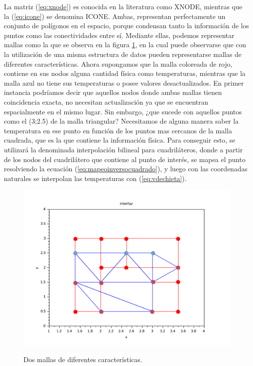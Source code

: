 La matriz (\ref{eq:xnode}) es conocida en la literatura como XNODE, mientras que la (\ref{eq:icone}) se denomina ICONE. Ambas, representan perfectamente un conjunto de polígonos en el espacio, porque condensan tanto la información de los puntos como las conectividades entre sí. Mediante ellas, podemos representar mallas como la que se observa en la figura \ref{fig:malla1}, en la cual puede observarse que con la utilización de una misma estructura de datos pueden representarse mallas de diferentes características. Ahora supongamos que la malla coloreada de rojo, contiene en sus nodos alguna cantidad física como temperaturas, mientras que la malla azul no tiene sus temperaturas o posee valores desactualizados. En primer instancia podríamos decir que aquellos nodos donde ambas mallas tienen coincidencia exacta, no necesitan actualización ya que se encuentran espacialmente en el mismo lugar. Sin embargo, ¿que sucede con aquellos puntos como el (3;2.5) de la malla triangular? Necesitamos de alguna manera saber la temperatura en ese punto en función de los puntos mas cercanos de la malla cuadrada, que es la que contiene la información física. Para conseguir esto, se utilizará la denominada interpolación bilineal para cuadriláteros, donde a partir de los nodos del cuadrilátero que contiene al punto de interés, se mapea el punto resolviendo la ecuación (\ref{eq:mapeoinversocuadrado}), y luego con las coordenadas naturales se interpolan las temperaturas con (\ref{eq:vdechieta}).


\begin{figure}
\centering
\includegraphics[scale=.55]{mallascuad1tri3p.pdf}
\caption{\label{fig:malla1} } Dos mallas de diferentes características.
\end{figure}

